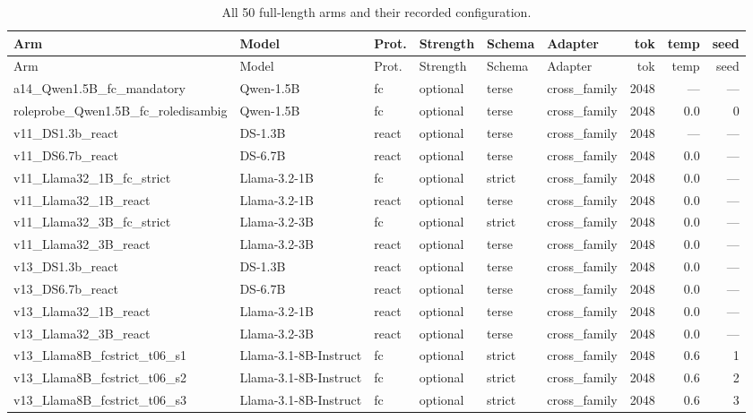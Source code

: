 {\scriptsize
\setlength{\tabcolsep}{2.5pt}
\begin{longtable}[]{@{}llllllrrr@{}}
\caption{All 50 full-length arms and their recorded configuration.}\label{tab:arms}\\
\toprule
Arm & Model & Prot. & Strength & Schema & Adapter & tok & temp & seed \\
\midrule
\endfirsthead
\toprule
Arm & Model & Prot. & Strength & Schema & Adapter & tok & temp & seed \\
\midrule
\endhead
a14\_Qwen1.5B\_fc\_mandatory & Qwen-1.5B & fc & optional & terse & cross\_family & 2048 & --- & --- \\
roleprobe\_Qwen1.5B\_fc\_roledisambig & Qwen-1.5B & fc & optional & terse & cross\_family & 2048 & 0.0 & 0 \\
v11\_DS1.3b\_react & DS-1.3B & react & optional & terse & cross\_family & 2048 & --- & --- \\
v11\_DS6.7b\_react & DS-6.7B & react & optional & terse & cross\_family & 2048 & 0.0 & --- \\
v11\_Llama32\_1B\_fc\_strict & Llama-3.2-1B & fc & optional & strict & cross\_family & 2048 & 0.0 & --- \\
v11\_Llama32\_1B\_react & Llama-3.2-1B & react & optional & terse & cross\_family & 2048 & 0.0 & --- \\
v11\_Llama32\_3B\_fc\_strict & Llama-3.2-3B & fc & optional & strict & cross\_family & 2048 & 0.0 & --- \\
v11\_Llama32\_3B\_react & Llama-3.2-3B & react & optional & terse & cross\_family & 2048 & 0.0 & --- \\
v13\_DS1.3b\_react & DS-1.3B & react & optional & terse & cross\_family & 2048 & 0.0 & --- \\
v13\_DS6.7b\_react & DS-6.7B & react & optional & terse & cross\_family & 2048 & 0.0 & --- \\
v13\_Llama32\_1B\_react & Llama-3.2-1B & react & optional & terse & cross\_family & 2048 & 0.0 & --- \\
v13\_Llama32\_3B\_react & Llama-3.2-3B & react & optional & terse & cross\_family & 2048 & 0.0 & --- \\
v13\_Llama8B\_fcstrict\_t06\_s1 & Llama-3.1-8B-Instruct & fc & optional & strict & cross\_family & 2048 & 0.6 & 1 \\
v13\_Llama8B\_fcstrict\_t06\_s2 & Llama-3.1-8B-Instruct & fc & optional & strict & cross\_family & 2048 & 0.6 & 2 \\
v13\_Llama8B\_fcstrict\_t06\_s3 & Llama-3.1-8B-Instruct & fc & optional & strict & cross\_family & 2048 & 0.6 & 3 \\

\end{longtable}}
